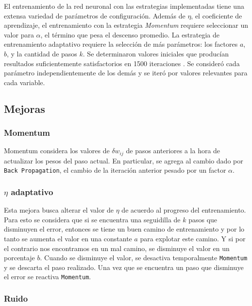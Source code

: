 \documentclass[a4paper,10pt]{article}
\begin{document}
        \label{configuracion}
        El entrenamiento de la red neuronal con las estrategias implementadas tiene una extensa variedad de parámetros de configuración. Además de $\eta$, 
        el coeficiente de aprendizaje, el entrenamiento con la estrategia \textit{Momentum} requiere seleccionar un valor para $\alpha$, el término que pesa el descenso promedio. 
        La estrategia de entrenamiento adaptativo requiere la selección de más parámetros: los factores $a$, $b$, y la cantidad de pasos $k$.
        Se determinaron valores iniciales que producían resultados suficientemente satisfactorios en 1500 iteraciones . Se consideró cada parámetro independientemente de 
        los demás y se iteró por valores relevantes para cada variable.

    \subsection{Mejoras}

        \subsubsection{Momentum}

        Momentum considera los valores de $\delta w_{ij}$ de pasos anteriores a la hora de actualizar los pesos del paso actual.
        En particular, se agrega al cambio dado por \texttt{Back Propagation}, el cambio de la iteración anterior pesado por un factor $\alpha$.

        \subsubsection{$\eta$ adaptativo}

        Esta mejora busca alterar el valor de $\eta$ de acuerdo al progreso del entrenamiento.
        Para esto se considera que si se encuentra una seguidilla de $k$ pasos que disminuyen el error, entonces se tiene un buen camino de entrenamiento y por lo tanto se aumenta 
        el valor en una constante $a$ para explotar este camino. Y si por el contrario nos encontramos en un mal camino, se disminuye el valor en un porcentaje $b$.
        Cuando se disminuye el valor, se desactiva temporalmente \texttt{Momentum} y se descarta el paso realizado.
        Una vez que se encuentra un paso que disminuye el error se reactiva \texttt{Momentum}.

        \subsubsection{Ruido}
\end{document}
